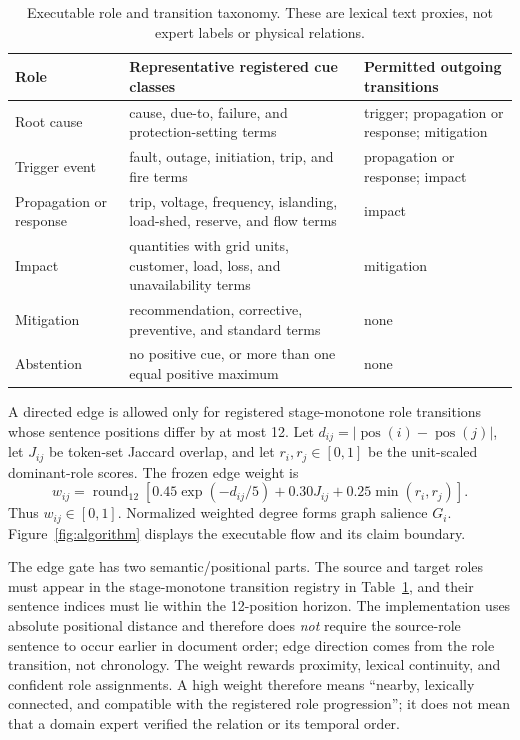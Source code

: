 \documentclass[applsci,article,submit,moreauthors]{Definitions/mdpi}
\begin{document}
\begin{table}[H]
\caption{Executable role and transition taxonomy. These are lexical text proxies, not expert labels or physical relations.}
\label{tab:taxonomy}\centering\small
\begin{tabularx}{\textwidth}{p{2.2cm}XX}
\toprule
Role & Representative registered cue classes & Permitted outgoing transitions\\
\midrule
Root cause & cause, due-to, failure, and protection-setting terms & trigger; propagation or response; mitigation\\
Trigger event & fault, outage, initiation, trip, and fire terms & propagation or response; impact\\
Propagation or response & trip, voltage, frequency, islanding, load-shed, reserve, and flow terms & impact\\
Impact & quantities with grid units, customer, load, loss, and unavailability terms & mitigation\\
Mitigation & recommendation, corrective, preventive, and standard terms & none\\
Abstention & no positive cue, or more than one equal positive maximum & none\\
\bottomrule
\end{tabularx}
\end{table}

A directed edge is allowed only for registered stage-monotone role transitions whose sentence positions differ by at most 12. Let $d_{ij}=|\operatorname{pos}(i)-\operatorname{pos}(j)|$, let $J_{ij}$ be token-set Jaccard overlap, and let $r_i,r_j\in[0,1]$ be the unit-scaled dominant-role scores. The frozen edge weight is
\[
w_{ij}=\operatorname{round}_{12}\!\left[0.45\exp(-d_{ij}/5)+0.30J_{ij}+0.25\min(r_i,r_j)\right].
\]
Thus $w_{ij}\in[0,1]$. Normalized weighted degree forms graph salience $G_i$. Figure~\ref{fig:algorithm} displays the executable flow and its claim boundary.

The edge gate has two semantic/positional parts. The source and target roles must appear in the stage-monotone transition registry in Table~\ref{tab:taxonomy}, and their sentence indices must lie within the 12-position horizon. The implementation uses absolute positional distance and therefore does \emph{not} require the source-role sentence to occur earlier in document order; edge direction comes from the role transition, not chronology. The weight rewards proximity, lexical continuity, and confident role assignments. A high weight therefore means ``nearby, lexically connected, and compatible with the registered role progression''; it does not mean that a domain expert verified the relation or its temporal order.
\end{document}
